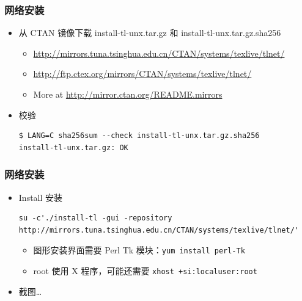 \documentclass{beamer}
\begin{document}
\begin{frame}[fragile]
  \frametitle{网络安装}
  \begin{itemize}
    \item 
从 CTAN 镜像下载
install-tl-unx.tar.gz
和
install-tl-unx.tar.gz.sha256
\begin{itemize} %
  \item \url{http://mirrors.tuna.tsinghua.edu.cn/CTAN/systems/texlive/tlnet/}
  \item \url{http://ftp.ctex.org/mirrors/CTAN/systems/texlive/tlnet/}
  \item More at \url{http://mirror.ctan.org/README.mirrors}
\end{itemize}

\item 校验
\begin{lstlisting}
$ LANG=C sha256sum --check install-tl-unx.tar.gz.sha256 
install-tl-unx.tar.gz: OK
\end{lstlisting}

  \end{itemize}
\end{frame}

\begin{frame}[fragile]
  \frametitle{网络安装}
  \begin{itemize}
    \item Install 安装
      \begin{lstlisting}
su -c'./install-tl -gui -repository http://mirrors.tuna.tsinghua.edu.cn/CTAN/systems/texlive/tlnet/'
      \end{lstlisting}

      \begin{itemize}
        \item 图形安装界面需要 Perl Tk 模块：\texttt{yum install
          perl-Tk}
        \item root 使用 X 程序，可能还需要 \texttt{xhost
          +si:localuser:root}
      \end{itemize}
\item 截图\dots
\end{itemize}
\end{frame}
\end{document}
